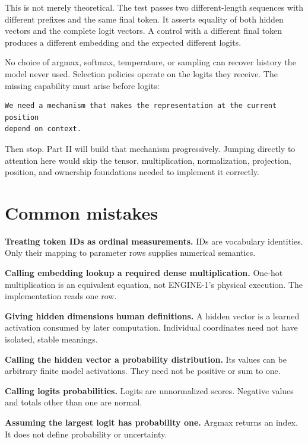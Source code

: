 This is not merely theoretical. The test
\texttt{}
passes two different-length sequences with different prefixes and the
same final token. It asserts equality of both hidden vectors and the
complete logit vectors. A control with a different final token produces
a different embedding and the expected different logits.

No choice of argmax, softmax, temperature, or sampling can recover
history the model never used. Selection policies operate on the logits
they receive. The missing capability must arise before logits:

\begin{verbatim}
We need a mechanism that makes the representation at the current position
depend on context.
\end{verbatim}

Then stop. Part II will build that mechanism progressively. Jumping
directly to attention here would skip the tensor, multiplication,
normalization, projection, position, and ownership foundations needed to
implement it correctly.

\section{Common mistakes}\label{common-mistakes-2}

\textbf{Treating token IDs as ordinal measurements.} IDs are vocabulary
identities. Only their mapping to parameter rows supplies numerical
semantics.

\textbf{Calling embedding lookup a required dense multiplication.}
One-hot multiplication is an equivalent equation, not ENGINE-1's
physical execution. The implementation reads one row.

\textbf{Giving hidden dimensions human definitions.} A hidden vector is
a learned activation consumed by later computation. Individual
coordinates need not have isolated, stable meanings.

\textbf{Calling the hidden vector a probability distribution.} Its
values can be arbitrary finite model activations. They need not be
positive or sum to one.

\textbf{Calling logits probabilities.} Logits are unnormalized scores.
Negative values and totals other than one are normal.

\textbf{Assuming the largest logit has probability one.} Argmax returns
an index. It does not define probability or uncertainty.

